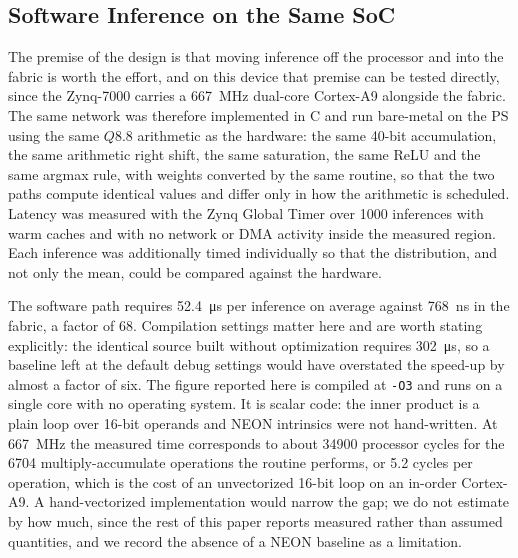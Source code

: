 \documentclass[final,5p,times,twocolumn]{elsarticle}
\begin{document}
\subsection{Software Inference on the Same SoC}
\label{sec:arm_baseline}
The premise of the design is that moving inference off the processor and into
the fabric is worth the effort, and on this device that premise can be tested
directly, since the Zynq-7000 carries a \SI{667}{\mega\hertz} dual-core
Cortex-A9 alongside the fabric. The same network was therefore implemented in C
and run bare-metal on the PS using the same $Q8.8$ arithmetic as the hardware:
the same 40-bit accumulation, the same arithmetic right shift, the same
saturation, the same ReLU and the same argmax rule, with weights converted by
the same routine, so that the two paths compute identical values and differ only
in how the arithmetic is scheduled. Latency was measured with the Zynq Global
Timer over \num{1000} inferences with warm caches and with no network or DMA
activity inside the measured region. Each inference was additionally timed
individually so that the distribution, and not only the mean, could be compared
against the hardware.

The software path requires \SI{52.4}{\micro\second} per inference on average
against \SI{768}{\nano\second} in the fabric, a factor of $68$. Compilation settings
matter here and are worth stating explicitly: the identical source built without
optimization requires \SI{302}{\micro\second}, so a baseline left at the default
debug settings would have overstated the speed-up by almost a factor of six. The
figure reported here is compiled at \texttt{-O3} and runs on a single core with
no operating system. It is scalar code: the inner product is a plain loop over
16-bit operands and NEON intrinsics were not hand-written. At
\SI{667}{\mega\hertz} the measured time corresponds to about \num{34900}
processor cycles for the \num{6704} multiply-accumulate operations the routine
performs, or 5.2 cycles per operation, which is the cost of an unvectorized
16-bit loop on an in-order Cortex-A9. A hand-vectorized implementation would narrow the gap; we
do not estimate by how much, since the rest of this paper reports measured
rather than assumed quantities, and we record the absence of a NEON baseline as
a limitation.
\end{document}
